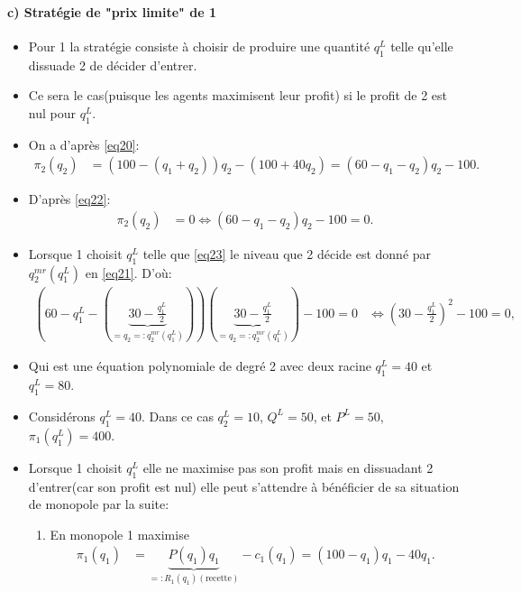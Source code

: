 \begin{frame}[allowframebreaks]{\insertsection}
\framesubtitle{c) Stratégie de "prix limite" de 1}
    \begin{itemize}
        \item Pour 1 la stratégie consiste à choisir de produire une quantité $q_1^L$ telle qu'elle dissuade 2 
        de décider d'entrer. 
        \item Ce sera le cas(puisque les agents maximisent leur profit) si le profit de 2 est nul pour $q_1^L$.
        \item On a d'après \eqref{eq20}:
        \begin{align}
            \pi_2(q_2) &= (100 - (q_1 + q_2))q_2 - (100 + 40q_2) = (60 - q_1-q_2)q_2 - 100.
         \label{eq22}
        \end{align}
        \item D'après \eqref{eq22}:
        \begin{align}
            \pi_2(q_2) &= 0 \Leftrightarrow  (60 - q_1-q_2)q_2 - 100 = 0.
            \label{eq23}
        \end{align}
        \item Lorsque 1 choisit $q_1^L$ telle que \eqref{eq23} le niveau 
        que 2 décide est donné par $q_2^{mr}(q_1^L)$ en \eqref{eq21}. D'où:
        \begin{align*}
            \left(60-q_1^L - \left(\underbrace{30 - \frac{q_1^L}{2}}_{=q_2=:q_2^{mr}(q_1^L)}\right)\right)\left(
                \underbrace{30 - \frac{q_1^L}{2}}_{=q_2=:q_2^{mr}(q_1^L)}\right) - 100 = 0& \Leftrightarrow 
                \left(30-\frac{q_1^L}{2}\right)^2 -100=0,
        \end{align*}
        \item Qui est une équation polynomiale de degré 2 avec deux racine $q_1^L = 40$ et $q_1^L = 80$.
        \item Considérons $q_1^L = 40$. Dans ce cas $q_2^L = 10$, $Q^L = 50$, et $P^L = 50$, $\pi_1(q_1^L) = 400$.
        \item Lorsque 1 choisit $q_1^L$ elle ne maximise pas son profit 
        mais en dissuadant 2 d'entrer(car son profit est nul) elle peut 
        s'attendre à bénéficier de sa situation de monopole par la suite:
        \begin{enumerate}[-]
            \item En monopole 1 maximise
            \begin{align*}
                \pi_1(q_1) &= \underbrace{P(q_1)q_1}_{=:R_1(q_1)(\text{recette})} -c_1(q_1) = (100-q_1)q_1 - 40q_1.

\end{align*}
\end{enumerate}
\end{itemize}
\end{frame}

